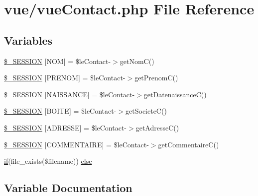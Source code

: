 \hypertarget{vue_contact_8php}{}\section{vue/vue\+Contact.php File Reference}
\label{vue_contact_8php}
\subsection*{Variables}
\begin{DoxyCompactItemize}
\item 
\hyperlink{vue_contact_8php_ad64427b45afdaf6e4b67050967e67ca4}{\$\+\_\+\+S\+E\+S\+S\+I\+ON} \mbox{[}\textquotesingle{}N\+OM\textquotesingle{}\mbox{]} = \$le\+Contact-\/$>$get\+NomC()
\item 
\hyperlink{vue_contact_8php_a40b484c43e18130a2d078dae156c7762}{\$\+\_\+\+S\+E\+S\+S\+I\+ON} \mbox{[}\textquotesingle{}P\+R\+E\+N\+OM\textquotesingle{}\mbox{]} = \$le\+Contact-\/$>$get\+PrenomC()
\item 
\hyperlink{vue_contact_8php_a8307a0c072f9238d89b5f6fb3bcb4ec4}{\$\+\_\+\+S\+E\+S\+S\+I\+ON} \mbox{[}\textquotesingle{}N\+A\+I\+S\+S\+A\+N\+CE\textquotesingle{}\mbox{]} = \$le\+Contact-\/$>$get\+DatenaissanceC()
\item 
\hyperlink{vue_contact_8php_a2e729f39c0508730cfa7774f5454b139}{\$\+\_\+\+S\+E\+S\+S\+I\+ON} \mbox{[}\textquotesingle{}B\+O\+I\+TE\textquotesingle{}\mbox{]} = \$le\+Contact-\/$>$get\+SocieteC()
\item 
\hyperlink{vue_contact_8php_ac9ef9a9da70a4e553b3bfc68ef1c79b1}{\$\+\_\+\+S\+E\+S\+S\+I\+ON} \mbox{[}\textquotesingle{}A\+D\+R\+E\+S\+SE\textquotesingle{}\mbox{]} = \$le\+Contact-\/$>$get\+AdresseC()
\item 
\hyperlink{vue_contact_8php_a12bf99e856d146952ed52fc9f95ee139}{\$\+\_\+\+S\+E\+S\+S\+I\+ON} \mbox{[}\textquotesingle{}C\+O\+M\+M\+E\+N\+T\+A\+I\+RE\textquotesingle{}\mbox{]} = \$le\+Contact-\/$>$get\+CommentaireC()
\item 
\hyperlink{controleur_create_phone_8php_ae87c4f53487f23ee9a965a6691be21d2}{if}(file\+\_\+exists(\$filename)) \hyperlink{vue_contact_8php_a9c7b424f3381bae115a191241a931639}{else}
\end{DoxyCompactItemize}


\subsection{Variable Documentation}
\mbox{\label{vue_contact_8php_ad64427b45afdaf6e4b67050967e67ca4}} 
